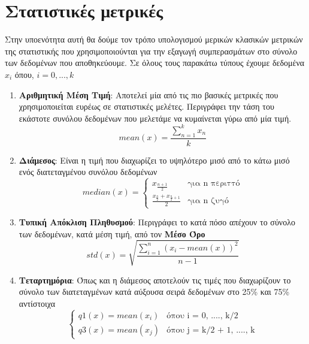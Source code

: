 \break

\section{Στατιστικές μετρικές}
\label{section:statistics}

Στην υποενότητα αυτή θα δούμε τον τρόπο υπολογισμού μερικών κλασικών μετρικών της στατιστικής
που χρησιμοποιούνται για την εξαγωγή συμπερασμάτων στο σύνολο των δεδομένων που αποθηκεύουμε.
Σε όλους τους παρακάτω τύπους έχουμε δεδομένα $x_i$ όπου, $i = 0, ..., k$

\begin{enumerate}
	\item \textbf{Αριθμητική Μέση Τιμή}: Αποτελεί μία από τις πιο βασικές μετρικές που χρησιμοποιείται ευρέως σε στατιστικές μελέτες.
		Περιγράφει την τάση του εκάστοτε συνόλου δεδομένων που μελετάμε να κυμαίνεται γύρω από μία τιμή.
	      \begin{equation}
		      mean(x) = \frac{\sum_{n = 1}^{k} x_n}{k}
	      \end{equation}
	\item \textbf{Διάμεσος}: Είναι η τιμή που διαχωρίζει το υψηλότερο μισό από το κάτω μισό ενός διατεταγμένου συνόλου δεδομένων 
	      \begin{equation}
		      median(x) =
		      \begin{cases}
			      x_{\frac{n + 1}{2}}                             & \text{για n περιττό}
			      \\[10pt]
			      \frac{x_{\frac{n}{2}} + x_{\frac{n}{2} + 1}}{2} & \text{για n ζυγό}
		      \end{cases}
	      \end{equation}
	\item \textbf{Τυπική Απόκλιση Πληθυσμού}: Περιγράφει το κατά πόσο απέχουν το σύνολο των δεδομένων, κατά μέση τιμή, από τον \textbf{Μέσο Όρο}
	      \begin{equation}
		      std(x) = \sqrt{\frac{\sum_{i = 1}^{n} (x_i - mean(x))^2}{n - 1}}
	      \end{equation}
	\item \textbf{Τεταρτημόρια}: Όπως και η διάμεσος αποτελούν τις τιμές που διαχωρίζουν το σύνολο των
		  διατεταγμένων κατά αύξουσα σειρά δεδομένων στο 25\% και 75\% αντίστοιχα  
	      \begin{equation}
				\begin{cases}
					q1(x) = mean(x_i) & \text{όπου i = 0, ...., k/2} \\
					q3(x) = mean(x_j) & \text{όπου j = k/2 + 1, ...., k}
				\end{cases}
	      \end{equation}
\end{enumerate}

\break